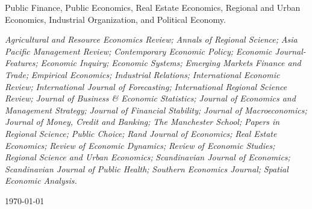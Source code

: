 \documentclass{xetexCV}
\begin{document}
Public Finance, Public Economics, Real Estate Economics, Regional and Urban Economics, Industrial Organization,  and Political Economy.


\nocite{*}



\begin{flushleft}
\emph{Agricultural and Resource Economics Review;}
\emph{Annals of Regional Science;}
\emph{Asia Pacific Management Review;}
\emph{Contemporary Economic Policy;} 
\emph{Economic Journal-Features;} 
\emph{Economic Inquiry;}
\emph{Economic Systems;}
\emph{Emerging Markets Finance and Trade;}
\emph{Empirical Economics;}
\emph{Industrial Relations;} 
\emph{International Economic Review;} 
\emph{International Journal of Forecasting;}
\emph{International Regional Science Review;}
\emph{Journal of Business \& Economic Statistics;}
\emph{Journal of Economics and Management Strategy;} 
\emph{Journal of Financial Stability;}
\emph{Journal of Macroeconomics;}
\emph{Journal of Money, Credit and Banking;} 
\emph{The Manchester School;} 
\emph{Papers in Regional Science;} 
\emph{Public Choice;} 
\emph{Rand Journal of Economics;} 
\emph{Real Estate Economics;}
\emph{Review of Economic Dynamics;} 
\emph{Review of Economic Studies;} 
\emph{Regional Science and Urban Economics;} 
\emph{Scandinavian Journal of Economics;}
\emph{Scandinavian Journal of Public Health;} 
\emph{Southern Economics Journal;}
\emph{Spatial Economic Analysis.}
\end{flushleft}
\begin{flushleft}
\today
\end{flushleft}
\end{document}
